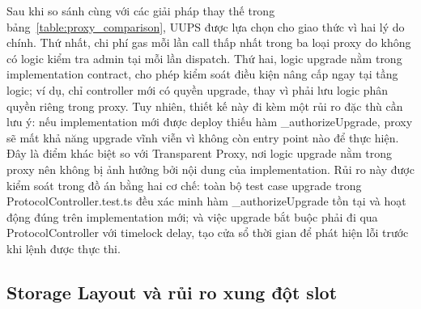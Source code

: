 \documentclass[../DoAn.tex]{subfiles}
\begin{document}
\begin{table}[H]
\centering
{}
\caption{So sánh 3 loại proxy phổ biến}
\label{table:proxy_comparison}
\end{table}


Sau khi so sánh cùng với các giải pháp thay thế trong bảng~\ref{table:proxy_comparison}, UUPS được lựa chọn cho giao thức vì hai lý do chính. Thứ nhất, chi phí gas mỗi lần call thấp nhất trong ba loại proxy do không có logic kiểm tra admin tại mỗi lần dispatch. Thứ hai, logic upgrade nằm trong implementation contract, cho phép kiểm soát điều kiện nâng cấp ngay tại tầng logic; ví dụ, chỉ controller mới có quyền upgrade, thay vì phải lưu logic phân quyền riêng trong proxy. Tuy nhiên, thiết kế này đi kèm một rủi ro đặc thù cần lưu ý: nếu implementation mới được deploy thiếu hàm \_authorizeUpgrade, proxy sẽ mất khả năng upgrade vĩnh viễn vì không còn entry point nào để thực hiện. Đây là điểm khác biệt so với Transparent Proxy, nơi logic upgrade nằm trong proxy nên không bị ảnh hưởng bởi nội dung của implementation. Rủi ro này được kiểm soát trong đồ án bằng hai cơ chế: toàn bộ test case upgrade trong ProtocolController.test.ts đều xác minh hàm \_authorizeUpgrade tồn tại và hoạt động đúng trên implementation mới; và việc upgrade bắt buộc phải đi qua ProtocolController với timelock delay, tạo cửa sổ thời gian để phát hiện lỗi trước khi lệnh được thực thi.

\subsection{Storage Layout và rủi ro xung đột slot}
\label{section:3.4.4}
\end{document}

